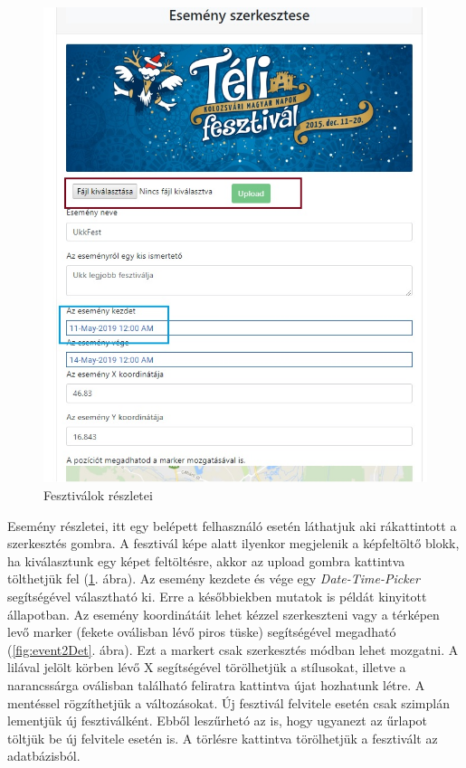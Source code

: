 \begin{figure}[h!]
\centering
\includegraphics[scale=0.8]{kepek/eventDet.jpg}
\caption{Fesztiválok részletei}
\label{fig:event1Det}
\end{figure}

Esemény részletei, itt egy belépett felhasználó esetén láthatjuk aki rákattintott a szerkesztés gombra. A fesztivál képe alatt ilyenkor megjelenik a képfeltöltő blokk, ha kiválasztunk egy képet feltöltésre, akkor az upload gombra kattintva tölthetjük fel (\ref{fig:event1Det}. ábra). Az esemény kezdete és vége egy \textit{Date-Time-Picker} segítségével választható ki. Erre a későbbiekben mutatok is példát kinyitott állapotban. Az esemény koordinátáit lehet kézzel szerkeszteni vagy a térképen levő marker (fekete oválisban lévő piros tüske) segítségével megadható (\ref{fig:event2Det}. ábra). Ezt a markert csak szerkesztés módban lehet mozgatni. A lilával jelölt körben lévő X segítségével törölhetjük a stílusokat, illetve a narancssárga oválisban található feliratra kattintva újat hozhatunk létre. A mentéssel rögzíthetjük a változásokat. Új fesztivál felvitele esetén csak szimplán lementjük új fesztiválként. Ebből leszűrhetó az is, hogy ugyanezt az űrlapot töltjük be új felvitele esetén is. A törlésre kattintva törölhetjük a fesztivált az adatbázisból. 


